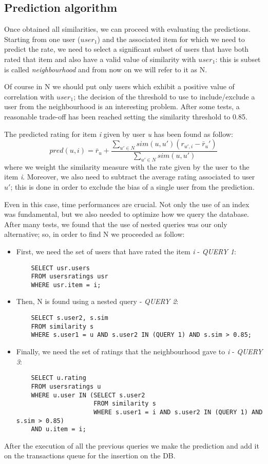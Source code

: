 \subsection{Prediction algorithm}
Once obtained all similarities, we can proceed with evaluating the predictions. Starting from one user ($user_1$) and the associated item for which we need to predict the rate, we need to select a significant subset of users that have both rated that item and also have a valid value of similarity with $user_1$: this is subset is called \textit{neighbourhood} and from now on we will refer to it as N.

Of course in N we should put only users which exhibit a positive value of correlation with $user_1$; the decision of the threshold to use to include/exclude a user from the neighbourhood is an interesting problem. After some tests, a reasonable trade-off has been reached setting the similarity threshold to 0.85.

The predicted rating for item \textit{i} given by user \textit{u} has been found as follow:
\begin{equation}
	pred(u,i) = \bar{r}_u + 
	\frac{
		\sum_{u' \in N} sim(u,u') (r_{u',i} - \bar{r}_u')
	}{
		\sum_{u' \in N} sim(u,u')
	}
\end{equation}
where we weight the similarity measure with the rate given by the user to the item \textit{i}. Moreover, we also need to subtract the average rating associated to user \textit{$u'$}; this is done in order to exclude the bias of a single user from the prediction.

Even in this case, time performances are crucial. Not only the use of an index was fundamental, but we also needed to optimize how we query the database. After many tests, we found that the use of nested queries was our only alternative; so, in order to find N we proceeded as follow:
\begin{itemize}
	\item First, we need the set of users that have rated the item \textit{i} - \textit{QUERY 1}:
	\begin{verbatim}
	SELECT usr.users
	FROM usersratings usr
	WHERE usr.item = i;
	\end{verbatim}
	\item Then, N is found using a nested query - \textit{QUERY 2}:
	\begin{verbatim}
	SELECT s.user2, s.sim
	FROM similarity s
	WHERE s.user1 = u AND s.user2 IN (QUERY 1) AND s.sim > 0.85;
	\end{verbatim}
	\item Finally, we need the set of ratings that the neighbourhood gave to \textit{i} - \textit{QUERY 3}:
	\begin{verbatim}
	SELECT u.rating 
	FROM usersratings u 
	WHERE u.user IN (SELECT s.user2
					 FROM similarity s
					 WHERE s.user1 = i AND s.user2 IN (QUERY 1) AND s.sim > 0.85) 
	AND u.item = i;
	\end{verbatim}	
\end{itemize}
After the execution of all the previous queries we make the prediction and add it on the transactions queue for the insertion on the DB.

